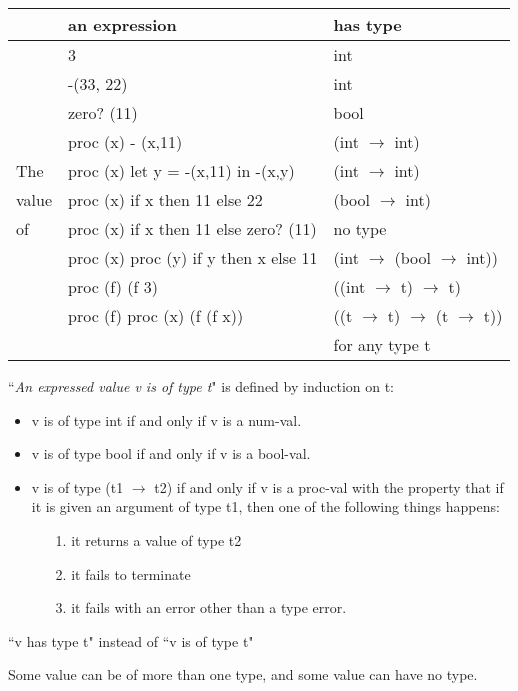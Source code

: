 \documentclass{article}
\begin{document}
\begin{huge}
\begin{tabular}{l | l | l} 
& an expression & has type \\ \hline 
&  3 &  int \\
& -(33, 22) & int \\
& zero? (11) & bool \\
& proc (x) - (x,11) & (int $\rightarrow$ int) \\
The & proc (x) let y = -(x,11) in -(x,y) & (int $\rightarrow$ int) \\
value & proc (x) if x then 11 else 22 &  (bool $\rightarrow$ int) \\
of & proc (x) if x then 11 else zero? (11) &  no type \\
& proc (x) proc (y) if y then x else 11 &  (int $\rightarrow$ (bool $\rightarrow$ int)) \\
& proc (f) (f 3) & ((int $\rightarrow$ t) $\rightarrow$ t) \\
& proc (f) proc (x) (f (f x)) & ((t $\rightarrow$ t) $\rightarrow$ (t $\rightarrow$ t)) \\ \hline
& & for any type t
\end{tabular}

   

``{\it An expressed value v is of type t}" is defined by induction on t:
\begin{itemize}
\item v is of type int if and only if v is a num-val.
\item v is of type bool if and only if v is a bool-val.
\item v is of type (t1 $\rightarrow$ t2) if and only if v is a proc-val with the property that if
it is given an argument of type t1, then one of the following things happens:
\begin{itemize}
\item[1.] it returns a value of type t2
\item[2.] it fails to terminate
\item[3.] it fails with an error other than a type error.
\end{itemize} 
\end{itemize}

``v has type t" instead of ``v is of type t"

Some value can be of more than one type, and some value can have no type.



\end{huge}
\end{document}
